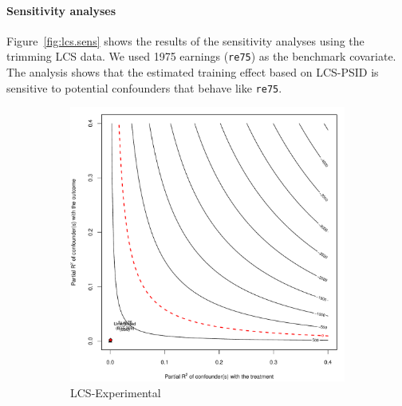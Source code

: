 \documentclass[letterpaper,12pt,leqno]{article}
\begin{document}
\clearpage

\paragraph{Sensitivity analyses} Figure~\ref{fig:lcs.sens} shows the results of the sensitivity analyses using the trimming LCS data. We used 1975 earnings (\texttt{re75}) as the benchmark covariate. The analysis shows that the estimated training effect based on LCS-PSID is sensitive to potential confounders that behave like \texttt{re75}. 

\begin{figure}[!ht]
    \caption{Sensitivity Analyses for Trimmed LDW-CPS and LDW-PSID}\label{fig:lcs.sens}
    \begin{minipage}[c]{1\textwidth}
        \centering
        \begin{subfigure}{0.45\linewidth}
            \includegraphics[width=\linewidth]{sens_lcs.pdf}
            \caption{LCS-Experimental}
        \end{subfigure}\hspace{1em}
        \begin{subfigure}{0.45\linewidth}

\end{subfigure}
\end{minipage}
\end{figure}
\end{document}
